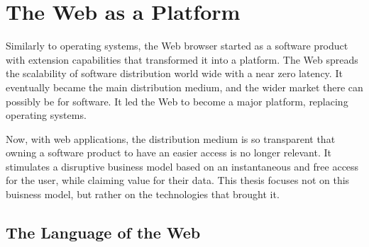 \section{The Web as a Platform} \label{chapter2:web-as-a-platform}



Similarly to operating systems, the Web browser started as a software product with extension capabilities that transformed it into a platform. %
The Web spreads the scalability of software distribution world wide with a near zero latency.
It eventually became the main distribution medium, and the wider market there can possibly be for software.
It led the Web to become a major platform, replacing operating systems.

Now, with web applications, the distribution medium is so transparent that owning a software product to have an easier access is no longer relevant.
It stimulates a disruptive business model based on an instantaneous and free access for the user, while claiming value for their data.
This thesis focuses not on this buisness model, but rather on the technologies that brought it.

\subsection{The Language of the Web}

